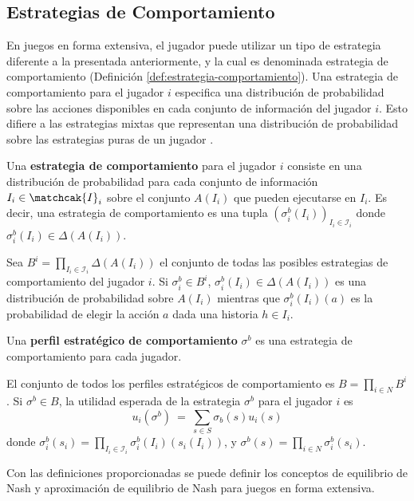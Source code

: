 \subsection{Estrategias de Comportamiento}

En juegos en forma extensiva, el jugador puede utilizar un tipo de estrategia diferente a la presentada anteriormente, y la cual es denominada estrategia de comportamiento (Definición \ref{def:estrategia-comportamiento}). Una estrategia de comportamiento para el jugador $i$ especifica una distribución de probabilidad sobre las acciones disponibles en cada conjunto de información del jugador $i$. Esto difiere a las estrategias mixtas que representan una distribución de probabilidad sobre las estrategias puras de un jugador \cite[p. 212]{bib:course-game-theory}. 

\begin{definition}
\label{def:estrategia-comportamiento}
Una \textbf{estrategia de comportamiento} para el jugador $i$ consiste en una distribución de probabilidad para cada conjunto de información $I_i\in\matchcak{I}_i$ sobre el conjunto $A(I_i)$ que pueden ejecutarse en $I_i$.
Es decir, una estrategia de comportamiento es una tupla $(\sigma^b_i(I_i))_{I_i \in \mathcal{I}_i}$ donde $\sigma^b_i(I_i) \in \Delta(A(I_i))$.
\end{definition}

Sea $B^i = \prod_{I_i \in \mathcal{I}_i} \Delta(A(I_i))$ el conjunto de todas las posibles estrategias de comportamiento del jugador $i$. Si $\sigma_i^b \in B^i$, $\sigma_i^b(I_i) \in \Delta(A(I_i))$ es una distribución de probabilidad sobre $A(I_i)$ mientras que $\sigma_i^b(I_i)(a)$ es la probabilidad de elegir la acción $a$ dada una historia $h \in I_i$.

\begin{definition}
Una \textbf{perfil estratégico de comportamiento} $\sigma^b$ es una estrategia de comportamiento para cada jugador.
\end{definition}

El conjunto de todos los perfiles estratégicos de comportamiento es $B = \prod_{i \in N} B^i$. Si $\sigma^b \in B$, la utilidad esperada de la estrategia $\sigma^b$ para el jugador $i$ es
\[ u_i(\sigma^b)\ =\ \sum_{s \in S} \sigma_b(s)u_i(s) \]
donde $\sigma_i^b(s_i) = \prod_{I_i \in \mathcal{I}_i} \sigma_i^b(I_i)(s_i(I_i))$, y $\sigma^b(s) =  \prod_{i \in N} \sigma_i^b(s_i)$.

Con las definiciones proporcionadas se puede definir los conceptos de equilibrio de Nash y aproximación de equilibrio de Nash para juegos en forma extensiva.

